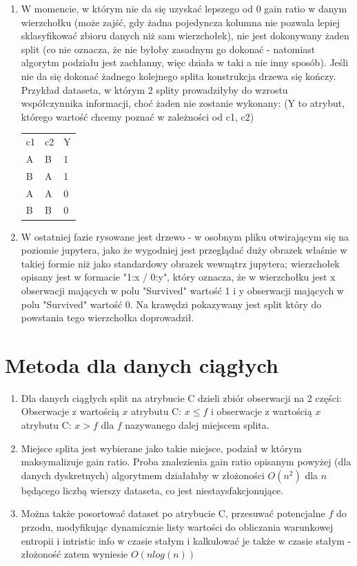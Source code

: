 \documentclass[12pt]{article}
\begin{document}
\begin{enumerate}
	\item W momencie, w którym nie da się uzyskać lepszego od 0 gain ratio w danym wierzchołku (może zajść, gdy żadna pojedyncza kolumna nie pozwala lepiej sklasyfikować zbioru danych niż sam wierzchołek), nie jest dokonywany żaden split (co nie oznacza, że nie byłoby zasadnym go dokonać - natomiast algorytm podziału jest zachłanny, więc działa w taki a nie inny sposób). Jeśli nie da się dokonać żadnego kolejnego splita konstrukcja drzewa się kończy. Przykład dataseta, w którym 2 splity prowadziłyby do wzrostu współczynnika informacji, choć żaden nie zostanie wykonany: (Y to atrybut, którego wartość chcemy poznać w zależności od c1, c2)\\
		\begin{tabular}{lll}
			c1 &  c2 &  Y \\
			A & B & 1 \\
			B & A & 1 \\
			A & A & 0 \\ 
			B & B & 0 \\ 
		\end{tabular}
	
	\item W ostatniej fazie rysowane jest drzewo - w osobnym pliku otwirającym się na poziomie jupytera, jako że wygodniej jest przeglądać duży obrazek właśnie w takiej formie niż jako standardowy obrazek wewnątrz jupytera; wierzchołek opisany jest w formacie "1:x / 0:y", który oznacza, że w wierzchołku jest x obserwacji mających w polu "Survived" wartość 1 i y obserwacji mających w polu "Survived" wartość 0. Na krawędzi pokazywany jest split który do powstania tego wierzchołka doprowadził.
\end{enumerate}

\section{Metoda dla danych ciągłych}
\begin{enumerate}
	\item Dla danych ciągłych split na atrybucie C dzieli zbiór obserwacji na 2 części: Obserwacje z wartością \(x\) atrybutu C: \(x \le f\) i obserwacje z wartością \(x\) atrybutu C: \(x > f\) dla \(f\) nazywanego dalej miejscem splita.
	\item Miejsce splita jest wybierane jako takie miejsce, podział w którym maksymalizuje gain ratio. Proba znalezienia gain ratio opisanym powyżej (dla danych dyskretnych) algorytmem działałaby w złożoności \(O(n^2)\) dla \(n\) będącego liczbą wierszy dataseta, co jest niestaysfakcjonujące.
	\item Można także posortować dataset po atrybucie C, przesuwać potencjalne \(f\) do przodu, modyfikując dynamicznie listy wartości do obliczania warunkowej entropii i intristic info w czasie stałym i kalkulować je także w czasie stałym - złożoność zatem wyniesie \(O(nlog(n))\)
\end{enumerate}
\end{document}
